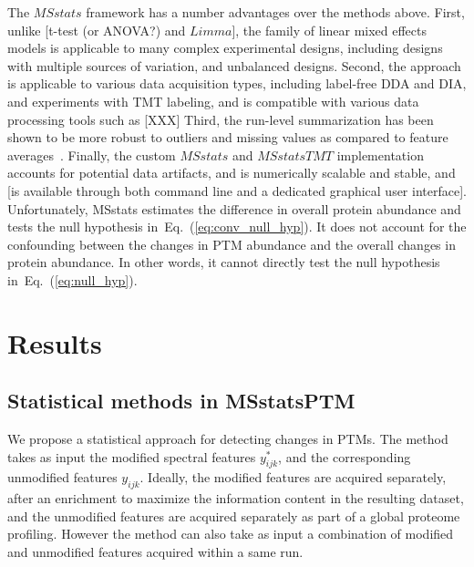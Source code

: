 \documentclass[mcp]{article}
\numberwithin{table}{section}
\def\todo#1{{\color{red}[#1]}}
\def\eqref#1{Eq.~(\ref{eq:#1})}
\begin{document}
The $MSstats$ framework has a number advantages over the methods above. 
First, unlike \todo{t-test (or ANOVA?) and $Limma$}, the family of linear mixed effects models is applicable to many complex experimental designs, including designs with multiple sources of variation, and unbalanced designs. 
Second, the approach is applicable to various data acquisition types, including label-free DDA and DIA, and experiments with TMT labeling, and is compatible with various data processing tools such as \todo{XXX} 
Third, the run-level summarization has been shown to be more robust to outliers and missing values as compared to feature averages~\cite{Choi:2014}. 
Finally, the custom $MSstats$ and $MSstatsTMT$ implementation accounts for potential data artifacts, and is numerically scalable and stable, and \todo{is available through both command line and a dedicated graphical user interface}.
Unfortunately, MSstats estimates the difference in overall protein abundance and tests the null hypothesis in~\eqref{conv_null_hyp}. It does not account for the confounding between the changes in PTM abundance and the overall changes in protein abundance. In other words, it cannot directly test the null hypothesis in~\eqref{null_hyp}.




\section{Results}

\subsection*{Statistical methods in MSstatsPTM}
\label{sec:adjustment_summary}

\medskip {}

\medskip \noindent
We propose a statistical approach for detecting changes in PTMs. The method takes as input the modified spectral features $y_{ijk}^{\ast}$, and the corresponding unmodified features $y_{ijk}$. Ideally, the modified features are acquired separately, after an enrichment to maximize the information content in the resulting dataset, and the unmodified features are acquired separately as part of a global proteome profiling. However the method can also take as input a combination of modified and unmodified features acquired within a same run.
\end{document}

